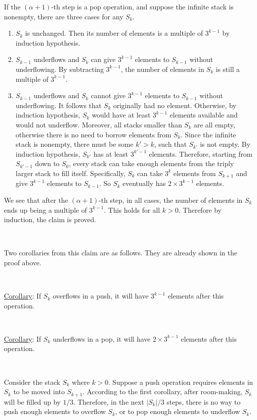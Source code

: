 \documentclass{article}
\begin{document}
If the $(\alpha+1)$-th step is a pop operation, and suppose the infinite stack is nonempty, there are three cases for any $S_k$.
\begin{enumerate}
\item$S_k$ is unchanged. Then its number of elements is a multiple of $3^{k-1}$ by induction hypothesis.
\item$S_{k-1}$ underflows and $S_k$ can give $3^{k-1}$ elements to $S_{k-1}$ without underflowing. By subtracting $3^{k-1}$, the number of elements in $S_k$ is still a multiple of $3^{k-1}$.
\item$S_{k-1}$ underflows and $S_k$ cannot give $3^{k-1}$ elements to $S_{k-1}$ without underflowing. It follows that $S_k$ originally had no element. Otherwise, by induction hypothesis, $S_k$ would have at least $3^{k-1}$ elements available and would not underflow. Moreover, all stacks smaller than $S_k$ are all empty, otherwise there is no need to borrow elements from $S_k$. Since the infinite stack is nonempty, there must be some $k'>k$, such that $S_{k'}$ is not empty. By induction hypothesis, $S_{k'}$ has at least $3^{k'-1}$ elements. Therefore, starting from $S_{k'-1}$ down to $S_0$, every stack can take enough elements from the triply larger stack to fill itself. Specifically, $S_k$ can take $3^k$ elements from $S_{k+1}$ and give $3^{k-1}$ elements to $S_{k-1}$. So $S_k$ eventually has $2\times 3^{k-1}$ elements.
\end{enumerate}

We see that after the $(\alpha+1)$-th step, in all cases, the number of elements in $S_k$ ends up being a multiple of $3^{k-1}$. This holds for all $k>0$. Therefore by induction, the claim is proved.


~

Two corollaries from this claim are as follows. They are already shown in the proof above.

~

\noindent\underline{Corollary}:
If $S_k$ overflows in a push, it will have $3^{k-1}$ elements after this operation.

~

\noindent\underline{Corollary}:
If $S_k$ underflows in a pop, it will have $2\times 3^{k-1}$ elements after this operation.

~

Consider the stack $S_k$ where $k>0$. Suppose a push operation requires elements in $S_k$ to be moved into $S_{k+1}$. According to the first corollary, after room-making, $S_k$ will be filled up by $1/3$. Therefore, in the next $|S_k|/3$ steps, there is no way to push enough elements to overflow $S_k$, or to pop enough elements to underflow $S_k$.
\end{document}
